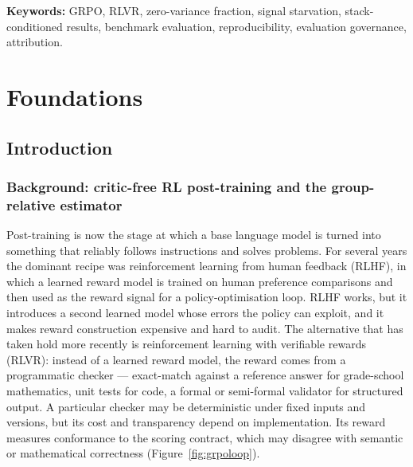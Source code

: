 \documentclass[12pt,a4paper]{report}
\begin{document}
\vspace{0.25in}
\noindent\textbf{Keywords:} GRPO, RLVR, zero-variance fraction, signal
starvation, stack-conditioned results, benchmark evaluation, reproducibility,
evaluation governance, attribution.

\tableofcontents
\listoffigures
\listoftables


\cleardoublepage
{}
\hypersetup{pageanchor=true}


\part{Foundations}


\chapter{Introduction}\label{introduction}

\section{Background: critic-free RL post-training and the group-relative
estimator}\label{background-critic-free-rl-post-training-and-the-group-relative-estimator}

Post-training is now the stage at which a base language model is turned
into something that reliably follows instructions and solves problems.
For several years the dominant recipe was reinforcement learning from
human feedback (RLHF), in which a learned reward model is trained on
human preference comparisons and then used as the reward signal for a
policy-optimisation loop. RLHF works, but it introduces a second learned
model whose errors the policy can exploit, and it makes reward
construction expensive and hard to audit. The alternative that has taken
hold more recently is reinforcement learning with verifiable rewards
(RLVR): instead of a learned reward model, the reward comes from a
programmatic checker --- exact-match against a reference answer for
grade-school mathematics, unit tests for code, a formal or semi-formal
validator for structured output. A particular checker may be
deterministic under fixed inputs and versions, but its cost and
transparency depend on implementation. Its reward measures conformance
to the scoring contract, which may disagree with semantic or
mathematical correctness (Figure~\ref{fig:grpoloop}).
\end{document}
